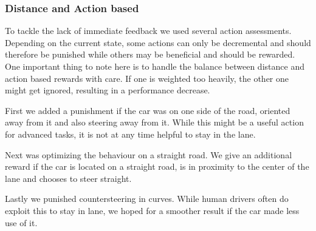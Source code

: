 \subsubsection{Distance and Action based}
To tackle the lack of immediate feedback we used several action assessments. Depending on the current state, some actions can only be decremental and should therefore be punished while others may be beneficial and should be rewarded. One important thing to note here is to handle the balance between distance and action based rewards with care. If one is weighted too heavily, the other one might get ignored, resulting in a performance decrease.

First we added a punishment if the car was on one side of the road, oriented away from it and also steering away from it. While this might be a useful action for advanced tasks, it is not at any time helpful to stay in the lane.

Next was optimizing the behaviour on a straight road. We give an additional reward if the car is located on a straight road, is in proximity to the center of the lane and chooses to steer straight.

Lastly we punished countersteering in curves. While human drivers often do exploit this to stay in lane, we hoped for a smoother result if the car made less use of it.